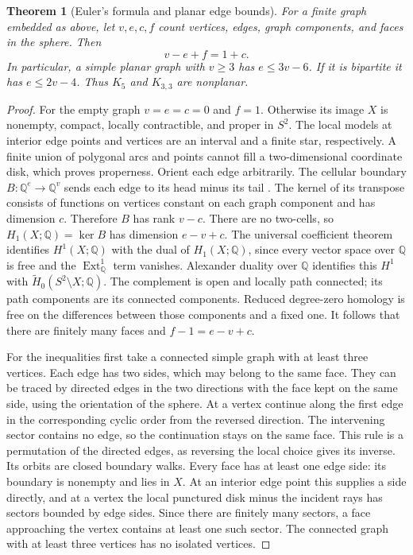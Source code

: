 \documentclass[11pt,oneside,openany]{book}
\theoremstyle{plain}
\newtheorem{theorem}{Theorem}[chapter]
\theoremstyle{definition}
\theoremstyle{remark}
\begin{document}
\begin{theorem}[Euler's formula and planar edge bounds]\label{p204:W62}
For a finite graph embedded as above, let \(v,e,c,f\) count vertices,
edges, graph components, and faces in the sphere. Then
\[
 v-e+f=1+c.
\]
In particular, a simple planar graph with \(v\ge3\) has \(e\le3v-6\).
If it is bipartite it has \(e\le2v-4\). Thus \(K_5\) and \(K_{3,3}\)
are nonplanar.
\end{theorem}
\begin{proof}
For the empty graph \(v=e=c=0\) and \(f=1\). Otherwise its
image \(X\) is nonempty, compact, locally contractible, and proper
in \(S^2\). The local models at interior edge points and vertices
are an interval and a finite star, respectively. A finite union
of polygonal arcs and points cannot fill a two-dimensional
coordinate disk, which proves properness. Orient each edge
arbitrarily. The cellular boundary \(B:\mathbb Q^e\to\mathbb Q^v\)
sends each edge to its head minus its tail
\cite[Theorem 4.2]{P202}. The kernel of its transpose consists of
functions on vertices constant on each graph component and has
dimension \(c\). Therefore \(B\) has rank \(v-c\). There are no
two-cells, so \(H_1(X;\mathbb Q)=\ker B\) has dimension \(e-v+c\).
The universal coefficient theorem \cite[Theorem 4.13]{P202}
identifies \(H^1(X;\mathbb Q)\) with the dual of \(H_1(X;\mathbb Q)\),
since every vector space over \(\mathbb Q\) is free and the
\(\operatorname{Ext}^1_{\mathbb Q}\) term vanishes.
Alexander duality over \(\mathbb Q\)
\cite[Theorem 5.6]{P202} identifies this \(H^1\) with
\(\widetilde H_0(S^2\setminus X;\mathbb Q)\).
The complement is open and locally path connected; its path
components are its connected components. Reduced degree-zero
homology is free on the differences between those components
and a fixed one. It follows that there are finitely many faces
and \(f-1=e-v+c\).

For the inequalities first take a connected simple graph with at
least three vertices. Each edge has two sides, which may belong
to the same face. They can be traced by directed edges in the
two directions with the face kept on the same side, using the
orientation of the sphere. At a vertex continue along the first
edge in the corresponding cyclic order from the reversed
direction. The intervening sector contains no edge, so the
continuation stays on the same face. This rule is a permutation
of the directed edges, as reversing the local choice gives its
inverse. Its orbits are closed boundary walks. Every face has
at least one edge side: its boundary is nonempty and lies in
\(X\). At an interior edge point this supplies a side directly,
and at a vertex the local punctured disk minus the incident
rays has sectors bounded by edge sides. Since there are finitely
many sectors, a face approaching the vertex contains at least
one such sector. The connected graph with at least three
vertices has no isolated vertices.


\end{proof}
\end{document}
